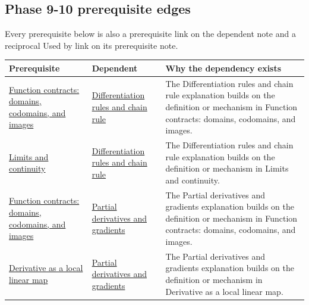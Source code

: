 \subsection{Phase 9-10 prerequisite edges}\label{appendix-4ad47bdd269a-phase-9-10-prerequisite-edges}

\hypertarget{appendix-4ad47bdd269a-phase-9-10-prerequisite-edges}{}

Every prerequisite below is also a prerequisite link on the dependent note and a reciprocal Used by link on its prerequisite note.

{\def\LTcaptype{none} %
\begin{longtable}[]{@{}
  >{\raggedright\arraybackslash}p{}
  >{\raggedright\arraybackslash}p{}
  >{\raggedright\arraybackslash}p{}@{}}
\toprule\noalign{}
\begin{minipage}[b]{\linewidth}\raggedright
Prerequisite
\end{minipage} & \begin{minipage}[b]{\linewidth}\raggedright
Dependent
\end{minipage} & \begin{minipage}[b]{\linewidth}\raggedright
Why the dependency exists
\end{minipage} \\
\midrule\noalign{}
\endhead
\bottomrule\noalign{}
\endlastfoot
\hyperref[appendix-a59658325cd6]{Function contracts: domains, codomains, and images} & \hyperref[appendix-d9f70bdfbc92]{Differentiation rules and chain rule} & The Differentiation rules and chain rule explanation builds on the definition or mechanism in Function contracts: domains, codomains, and images. \\
\hyperref[appendix-fecc1847f5a3]{Limits and continuity} & \hyperref[appendix-d9f70bdfbc92]{Differentiation rules and chain rule} & The Differentiation rules and chain rule explanation builds on the definition or mechanism in Limits and continuity. \\
\hyperref[appendix-a59658325cd6]{Function contracts: domains, codomains, and images} & \hyperref[appendix-677b59746ae0]{Partial derivatives and gradients} & The Partial derivatives and gradients explanation builds on the definition or mechanism in Function contracts: domains, codomains, and images. \\
\hyperref[appendix-7bc181935c42]{Derivative as a local linear map} & \hyperref[appendix-677b59746ae0]{Partial derivatives and gradients} & The Partial derivatives and gradients explanation builds on the definition or mechanism in Derivative as a local linear map. \\

\end{longtable}}

